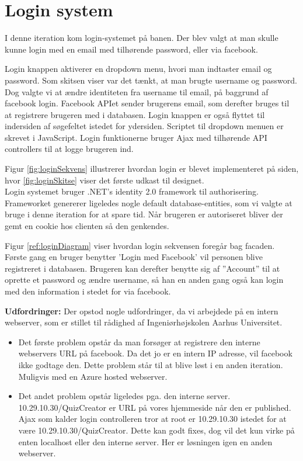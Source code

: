 \chapter{Login system}

I denne iteration kom login-systemet på banen. Der blev valgt at man skulle kunne login med en email med tilhørende password, eller via facebook.


Login knappen aktiverer en dropdown menu, hvori man indtaster email og password. Som skitsen viser var det tænkt, at man brugte username og password. Dog valgte vi at ændre identiteten fra username til email, på baggrund af facebook login. Facebook APIet sender brugerens email, som derefter bruges til at registrere brugeren med i databasen. Login knappen er også flyttet til indersiden af søgefeltet istedet for ydersiden. Scriptet til dropdown menuen er skrevet i JavaScript. Login funktionerne bruger Ajax med tilhørende API controllers til at logge brugeren ind.


Figur \ref{fig:loginSekvens} illustrerer hvordan login er blevet implementeret på siden, hvor \ref{fig:loginSkitse} viser det første udkast til designet. \\

Login systemet bruger .NET's identity 2.0 framework til authorisering. Frameworket genererer ligeledes nogle default database-entities, som vi valgte at bruge i denne iteration for at spare tid. Når brugeren er autoriseret bliver der gemt en cookie hos clienten så den genkendes.



Figur \ref{ref:loginDiagram} viser hvordan login sekvensen foregår bag facaden. Første gang en bruger benytter 'Login med Facebook' vil personen blive registreret i databasen. Brugeren kan derefter benytte sig af ''Account'' til at oprette et password og ændre username, så han en anden gang også kan login med den information i stedet for via facebook.

\textbf{Udfordringer:} 
Der opstod nogle udfordringer, da vi arbejdede på en intern webserver, som er stillet til rådighed af Ingeniørhøjskolen Aarhus Universitet. 

\begin{itemize}
	\item Det første problem opstår da man forsøger at registrere den interne webservers URL på facebook. Da det jo er en intern IP adresse, vil facebook ikke godtage den. Dette problem står til at blive løst i en anden iteration. Muligvis med en Azure hosted webserver.
	\item Det andet problem opstår ligeledes pga. den interne server. 10.29.10.30/QuizCreator er URL på vores hjemmeside når den er published. Ajax som kalder login controlleren tror at root er 10.29.10.30 istedet for at være 10.29.10.30/QuizCreator. Dette kan godt fixes, dog vil det kun virke på enten localhost eller den interne server. Her er løsningen igen en anden webserver.
\end{itemize}